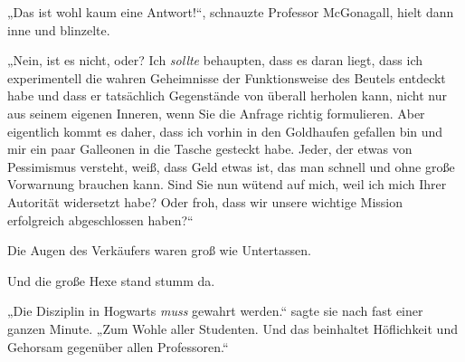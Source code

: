 „Das ist wohl kaum eine Antwort!“, schnauzte Professor McGonagall, hielt dann inne und blinzelte.

„Nein, ist es nicht, oder? Ich \emph{sollte} behaupten, dass es daran liegt, dass ich experimentell die wahren Geheimnisse der Funktionsweise des Beutels entdeckt habe und dass er tatsächlich Gegenstände von überall herholen kann, nicht nur aus seinem eigenen Inneren, wenn Sie die Anfrage richtig formulieren. Aber eigentlich kommt es daher, dass ich vorhin in den Goldhaufen gefallen bin und mir ein paar Galleonen in die Tasche gesteckt habe. Jeder, der etwas von Pessimismus versteht, weiß, dass Geld etwas ist, das man schnell und ohne große Vorwarnung brauchen kann. Sind Sie nun wütend auf mich, weil ich mich Ihrer Autorität widersetzt habe? Oder froh, dass wir unsere wichtige Mission erfolgreich abgeschlossen haben?“

Die Augen des Verkäufers waren groß wie Untertassen.

Und die große Hexe stand stumm da.

„Die Disziplin in Hogwarts \emph{muss} gewahrt werden.“ sagte sie nach fast einer ganzen Minute. „Zum Wohle aller Studenten. Und das beinhaltet Höflichkeit und Gehorsam gegenüber allen Professoren.“

